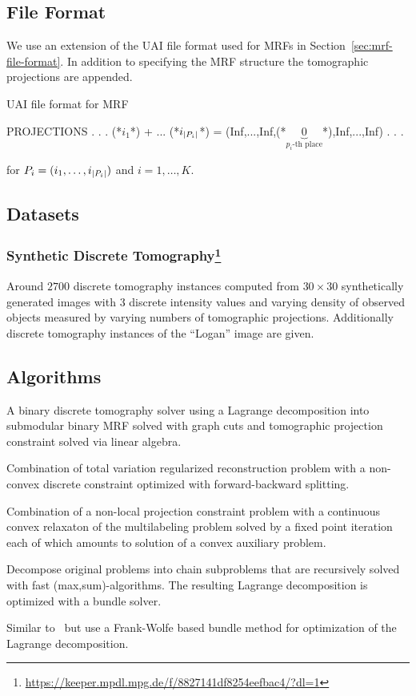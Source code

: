 \subsection{File Format}
We use an extension of the UAI file format used for MRFs in Section~\ref{sec:mrf-file-format}. In addition to specifying the  MRF structure the tomographic projections are appended.

\begin{fileformat}
UAI file format for MRF

PROJECTIONS
.
.
.
(*$i_1$*) + ... (*$i_{\lvert P_i\rvert}$*) =
    (Inf,...,Inf,(*$\underbrace{0}_{p_i\text{-th place}}$*),Inf,...,Inf)
.
.
.
\end{fileformat}
for $P_i = (i_1,\ldots,i_{\lvert P_i\rvert})$ and $i=1,\ldots,K$.

\subsection{Datasets}
\subsubsection[Synthetic Discrete Tomography]{Synthetic Discrete Tomography\footnote{\url{https://keeper.mpdl.mpg.de/f/8827141df8254eefbac4/?dl=1}}}
Around $2700$ discrete tomography instances computed from $30 \times 30$ synthetically generated images with 3 discrete intensity values and varying density of observed objects measured by varying numbers of tomographic projections.
Additionally discrete tomography instances of the ``Logan'' image are given.

\subsection{Algorithms}
\begin{description}[style=unboxed]
\item[\cite{kappes2015tomogc}:]
    A binary discrete tomography solver using a Lagrange decomposition into submodular binary MRF solved with graph cuts and tomographic projection constraint solved via linear algebra.
\item[\cite{zisler2016non}:]
    Combination of total variation regularized reconstruction problem with a non-convex discrete constraint optimized with forward-backward splitting.
\item[\cite{zisler2016discrete}:]
    Combination of a non-local projection constraint problem with a continuous convex relaxaton of the multilabeling problem solved by a fixed point iteration each of which amounts to solution of a convex auxiliary problem.
\item[Subgradient on decomposition into chain subproblems~\cite{kuske2017novel}:]
    Decompose original problems into chain subproblems that are recursively solved with fast (max,sum)-algorithms.
    The resulting Lagrange decomposition is optimized with a bundle solver.
\item[FW-Bundle Method~\cite{swoboda2019map}:]
    Similar to~\cite{kuske2017novel} but use a Frank-Wolfe based bundle method for optimization of the Lagrange decomposition.
\end{description}
